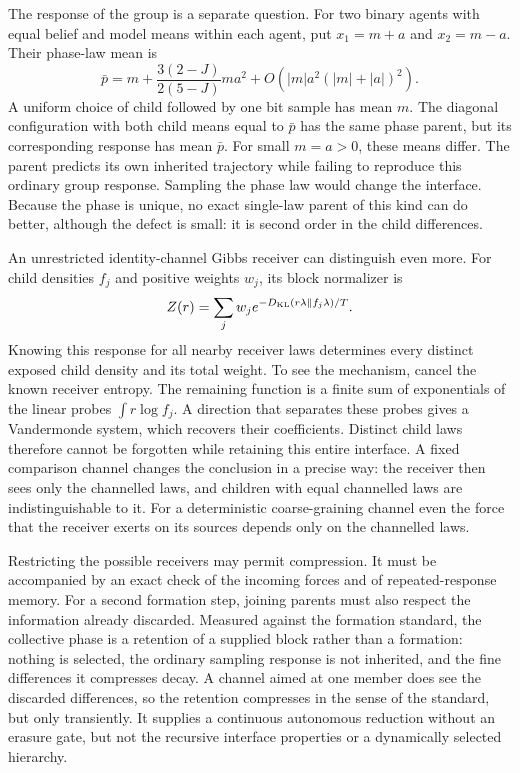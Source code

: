 The response of the group is a separate question. For two binary agents with equal belief and model means within each agent, put $x_1=m+a$ and $x_2=m-a$. Their phase-law mean is
\begin{equation}
 \bar p=m+\frac{3(2-J)}{2(5-J)}ma^2+O(|m|a^2(|m|+|a|)^2).
 \label{comp:eq-phase-response}
\end{equation}
A uniform choice of child followed by one bit sample has mean $m$. The diagonal configuration with both child means equal to $\bar p$ has the same phase parent, but its corresponding response has mean $\bar p$. For small $m=a>0$, these means differ. The parent predicts its own inherited trajectory while failing to reproduce this ordinary group response. Sampling the phase law would change the interface. Because the phase is unique, no exact single-law parent of this kind can do better, although the defect is small: it is second order in the child differences.

An unrestricted identity-channel Gibbs receiver can distinguish even more. For child densities $f_j$ and positive weights $w_j$, its block normalizer is
\begin{equation}
 Z(r)=\sum_jw_j e^{-D_{\mathrm{KL}}(r\lambda\Vert f_j\lambda)/T}.
 \label{comp:eq-phase-gibbs}
\end{equation}
Knowing this response for all nearby receiver laws determines every distinct exposed child density and its total weight. To see the mechanism, cancel the known receiver entropy. The remaining function is a finite sum of exponentials of the linear probes $\int r\log f_j$. A direction that separates these probes gives a Vandermonde system, which recovers their coefficients. Distinct child laws therefore cannot be forgotten while retaining this entire interface. A fixed comparison channel changes the conclusion in a precise way: the receiver then sees only the channelled laws, and children with equal channelled laws are indistinguishable to it. For a deterministic coarse-graining channel even the force that the receiver exerts on its sources depends only on the channelled laws.

Restricting the possible receivers may permit compression. It must be accompanied by an exact check of the incoming forces and of repeated-response memory. For a second formation step, joining parents must also respect the information already discarded. Measured against the formation standard, the collective phase is a retention of a supplied block rather than a formation: nothing is selected, the ordinary sampling response is not inherited, and the fine differences it compresses decay. A channel aimed at one member does see the discarded differences, so the retention compresses in the sense of the standard, but only transiently. It supplies a continuous autonomous reduction without an erasure gate, but not the recursive interface properties or a dynamically selected hierarchy.
